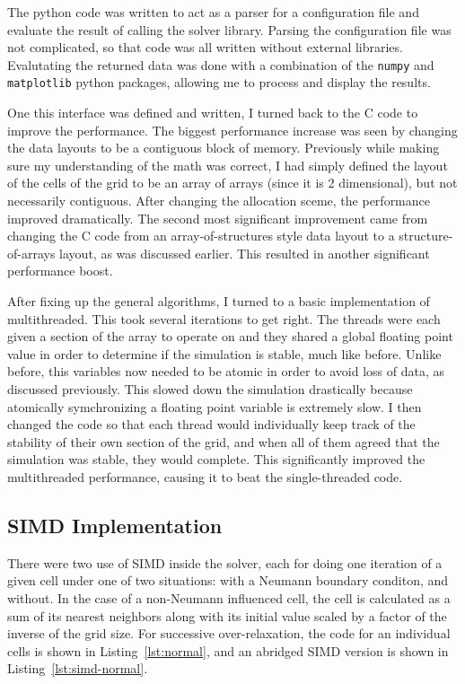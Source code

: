 The python code was written to act as a parser for a configuration file and evaluate the result of calling the solver library.
Parsing the configuration file was not complicated, so that code was all written without external libraries. Evalutating the
returned data was done with a combination of the \texttt{numpy} and \texttt{matplotlib} python packages, allowing me to process
and display the results.

One this interface was defined and written, I turned back to the C code to improve the performance. The biggest performance increase
was seen by changing the data layouts to be a contiguous block of memory. Previously while making sure my understanding of the math was
correct, I had simply defined the layout of the cells of the grid to be an array of arrays (since it is 2 dimensional), but not necessarily
contiguous. After changing the allocation sceme, the performance improved dramatically. The second most significant improvement came from
changing the C code from an array-of-structures style data layout to a structure-of-arrays layout, as was discussed earlier. This resulted in
another significant performance boost.

After fixing up the general algorithms, I turned to a basic implementation of multithreaded. This took several iterations to get right. The threads
were each given a section of the array to operate on and they shared a global floating point value in order to determine if the simulation is stable, much like before.
Unlike before, this variables now needed to be atomic in order to avoid loss of data, as discussed previously. This slowed down the simulation
drastically because atomically symchronizing a floating point variable is extremely slow. I then changed the code so that each thread would individually keep
track of the stability of their own section of the grid, and when all of them agreed that the simulation was stable, they would complete. This significantly improved
the multithreaded performance, causing it to beat the single-threaded code.

\subsection{SIMD Implementation}
There were two use of SIMD inside the solver, each for doing one iteration of a given cell under one of two situations: with a Neumann boundary conditon, and
without. In the case of a non-Neumann influenced cell, the cell is calculated as a sum of its nearest neighbors along with its initial value scaled by a
factor of the inverse of the grid size. For successive over-relaxation, the code for an individual cells is shown in Listing~\ref{lst:normal}, and an abridged
SIMD version is shown in Listing~\ref{lst:simd-normal}.

